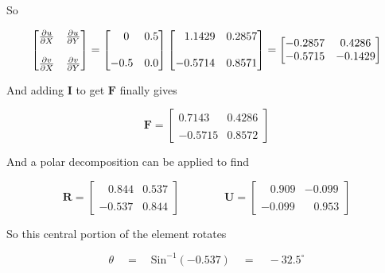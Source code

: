 So

\begin{align*}
\begin{bmatrix}
{\partial u \over \partial X} & {\partial u \over \partial Y} \\
\\
{\partial v \over \partial X} & {\partial v \over \partial Y} 
\end{bmatrix}
=
\begin{bmatrix}
\;\;\;0 & 0.5 \\
\\
-0.5 & 0.0
\end{bmatrix}
\begin{bmatrix}
\;\;\; 1.1429 & 0.2857 \\
\\
-0.5714 & 0.8571
\end{bmatrix}
=
\begin{bmatrix}
-0.2857 & 0.4286 \\
-0.5715 & -0.1429
\end{bmatrix}
\end{align*}

And adding $ \mathbf{ I} $ to get $ \mathbf{ F} $ finally gives

\begin{equation*}
\mathbf{ F} = 
\begin{bmatrix}
 0.7143 & 0.4286 \\
\\
-0.5715 & 0.8572
\end{bmatrix}
\end{equation*}

And a polar decomposition can be applied to find

\begin{equation*}
\mathbf{ R} = 
\begin{bmatrix}
 \;\;\; 0.844 & 0.537 \\
\\
-0.537 & 0.844
\end{bmatrix}
\qquad \qquad
\mathbf{ U} = 
\begin{bmatrix}
 \;\;\; 0.909 & -0.099 \\
\\
-0.099 & \;\;\; 0.953
\end{bmatrix}
\end{equation*}

So this central portion of the element rotates

\begin{equation*}
\theta \quad = \quad \text{Sin}^{-1}(-0.537) \quad = \quad -32.5^\circ
\end{equation*}

